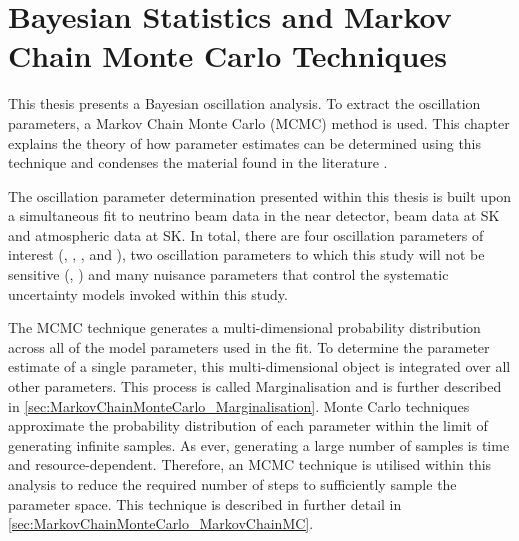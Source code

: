 \chapter{Bayesian Statistics and Markov Chain Monte Carlo Techniques}
\label{chap:MarkovChainMonteCarlo}
This thesis presents a Bayesian oscillation analysis. To extract the oscillation parameters, a Markov Chain Monte Carlo (MCMC) method is used. This chapter explains the theory of how parameter estimates can be determined using this technique and condenses the material found in the literature \cite{mcmc_handbook, mcmc_practice, thesis_clarence, thesis_kirsty}.

The oscillation parameter determination presented within this thesis is built upon a simultaneous fit to neutrino beam data in the near detector, beam data at SK and atmospheric data at SK. In total, there are four oscillation parameters of interest (\sinsqatm, \sinsqreac, \delmsqatm, and \dcp), two oscillation parameters to which this study will not be sensitive (\sinsqsol, \delmsqsol) and  many nuisance parameters that control the systematic uncertainty models invoked within this study.

The MCMC technique generates a multi-dimensional probability distribution across all of the model parameters used in the fit. To determine the parameter estimate of a single parameter, this multi-dimensional object is integrated over all other parameters. This process is called Marginalisation and is further described in \autoref{sec:MarkovChainMonteCarlo_Marginalisation}. Monte Carlo techniques approximate the probability distribution of each parameter within the limit of generating infinite samples. As ever, generating a large number of samples is time and resource-dependent. Therefore, an MCMC technique is utilised within this analysis to reduce the required number of steps to sufficiently sample the parameter space. This technique is described in further detail in \autoref{sec:MarkovChainMonteCarlo_MarkovChainMC}.

